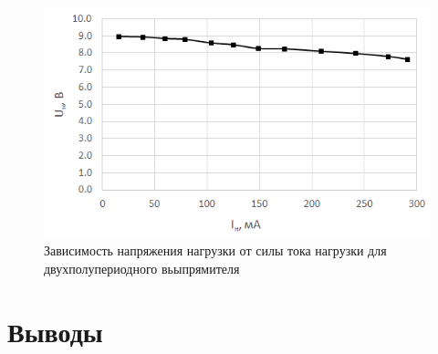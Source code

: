\begin{figure}[H]
	\begin{center}
		\includegraphics[width=15cm]{img/5}
		\caption{Зависимость напряжения нагрузки от силы тока нагрузки для двухполупериодного вьыпрямителя}
		\label{g:5} %
	\end{center}
\end{figure}

\vspace{-1cm}
\section{Выводы}



